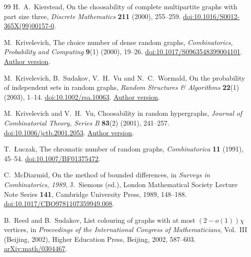 \documentclass[11pt]{article}
\numberwithin{equation}{section}
\begin{document}
\begin{thebibliography}{99}
H.~A.~Kierstead, On the choosability of complete multipartite graphs with part size three, \emph{Discrete Mathematics} \textbf{211} (2000), 255--259. \href{https://doi.org/10.1016/S0012-365X(99)00157-0}{doi:10.1016/S0012-365X(99)00157-0}.

M.~Krivelevich, The choice number of dense random graphs, \emph{Combinatorics, Probability and Computing} \textbf{9}(1) (2000), 19--26. \href{https://doi.org/10.1017/S0963548399004101}{doi:10.1017/S0963548399004101}. \href{https://www.math.tau.ac.il/~krivelev/26.pdf}{Author version}.

M.~Krivelevich, B.~Sudakov, V.~H.~Vu and N.~C.~Wormald, On the probability of independent sets in random graphs, \emph{Random Structures \& Algorithms} \textbf{22}(1) (2003), 1--14. \href{https://doi.org/10.1002/rsa.10063}{doi:10.1002/rsa.10063}. \href{https://people.math.ethz.ch/~sudakovb/probability-independent-set.pdf}{Author version}.

M.~Krivelevich and V.~H.~Vu, Choosability in random hypergraphs, \emph{Journal of Combinatorial Theory, Series B} \textbf{83}(2) (2001), 241--257. \href{https://doi.org/10.1006/jctb.2001.2053}{doi:10.1006/jctb.2001.2053}. \href{https://www.math.tau.ac.il/~krivelev/35.pdf}{Author version}.

T.~\L uczak, The chromatic number of random graphs, \emph{Combinatorica} \textbf{11} (1991), 45--54. \href{https://doi.org/10.1007/BF01375472}{doi:10.1007/BF01375472}.

C.~McDiarmid, On the method of bounded differences, in \emph{Surveys in Combinatorics, 1989}, J.~Siemons (ed.), London Mathematical Society Lecture Note Series \textbf{141}, Cambridge University Press, 1989, 148--188. \href{https://doi.org/10.1017/CBO9781107359949.008} {doi:10.1017/CBO9781107359949.008}.

B.~Reed and B.~Sudakov, List colouring of graphs with at most $(2-o(1))\chi$ vertices, in \emph{Proceedings of the International Congress of Mathematicians}, Vol.~III (Beijing, 2002), Higher Education Press, Beijing, 2002, 587--603. \href{https://arxiv.org/abs/math/0304467}{arXiv:math/0304467}.

\end{thebibliography}
\end{document}
